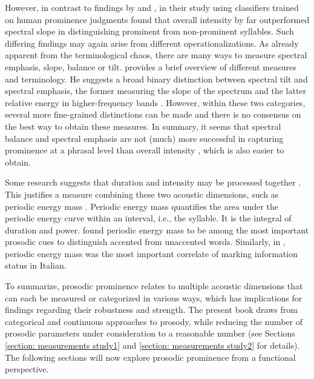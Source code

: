 However, in contrast to findings by \citet{sluijterSpectralBalanceAcoustic1996} and \citet{heldnerSpectralEmphasisAdditional2001}, \citet{kochanskiLoudnessPredictsProminence2005} in their study using classifiers trained on human prominence judgments found that overall intensity by far outperformed spectral slope in distinguishing prominent from non-prominent syllables. Such differing findings may again arise from different operationalizations. As already apparent from the terminological chaos, there are many ways to measure spectral emphasis, slope, balance or tilt. \citet{heldnerReliabilityOverallIntensity2003} provides a brief overview of different measures and terminology. He suggests a broad binary distinction between spectral tilt and spectral emphasis, the former measuring the slope of the spectrum and the latter relative energy in higher-frequency bands \citep[40]{heldnerReliabilityOverallIntensity2003}. However, within these two categories, several more fine-grained distinctions can be made and there is no consensus on the best way to obtain these measures. In summary, it seems that spectral balance and spectral emphasis are not (much) more successful in capturing prominence at a phrasal level than overall intensity \citep{sluijterSpectralBalanceAcoustic1996, heldnerSpectralEmphasisAdditional2001, kochanskiLoudnessPredictsProminence2005}, which is also easier to obtain. 

Some research suggests that duration and intensity may be processed together \citep[e.g.,][]{turkProcessingDurationIntensity1996}. This justifies a measure combining these two acoustic dimensions, such as periodic energy mass \citep{albertModelSonorityBased2023}. Periodic energy mass quantifies the area under the periodic energy curve within an interval, i.e., the syllable. It is the integral of duration and power. \citet{roessigTracingPhoneticSpace2022} found periodic energy mass to be among the most important prosodic cues to distinguish accented from unaccented words. Similarly, in \citet{sbrannaProsodicMarkingInformation2023}, periodic energy mass was the most important correlate of marking information status in Italian.

To summarize, prosodic prominence relates to multiple acoustic dimensions that can each be measured or categorized in various ways, which has implications for findings regarding their robustness and strength. The present book draws from categorical and continuous approaches to prosody, while reducing the number of prosodic parameters under consideration to a reasonable number (see Sections \ref{section: measurements study1} and \ref{section: measurements study2} for details). The following sections will now explore prosodic prominence from a functional perspective.


